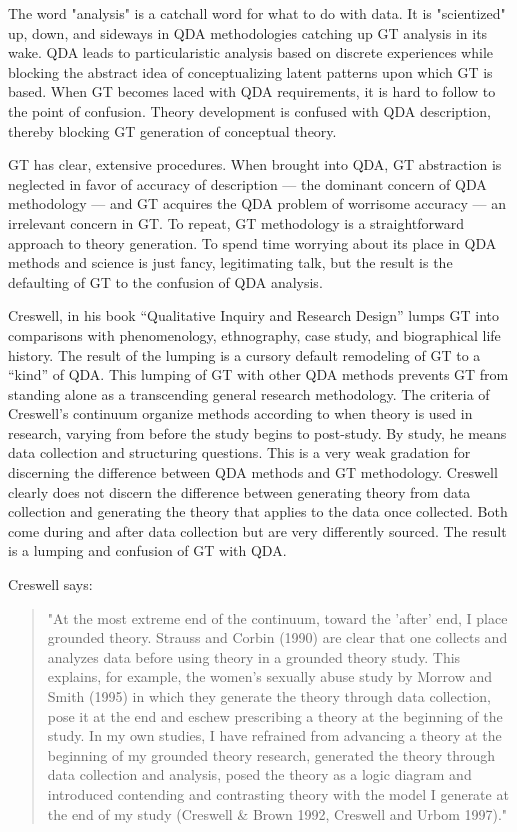 The word "analysis" is a catchall word for what to do with data.
It is "scientized" up, down, and sideways in QDA methodologies catching up GT analysis in its
wake.
QDA leads to particularistic analysis based on discrete experiences while
blocking the abstract idea of conceptualizing latent patterns upon which GT is
based.
When GT becomes laced with QDA requirements, it is hard to follow to
the point of confusion.
Theory development is confused with QDA description, thereby blocking GT generation of conceptual theory.

GT has clear, extensive procedures.
When brought into QDA, GT abstraction is neglected in favor of accuracy of description
--- the dominant concern of QDA methodology --- 
and GT acquires the QDA problem of worrisome accuracy
---
an irrelevant concern in GT.
To repeat, GT methodology is a straightforward approach to theory generation.
To spend time worrying about its place in QDA methods and science is just fancy, legitimating talk, but the result is the defaulting of GT to the confusion of QDA analysis.

Creswell, in his book “Qualitative Inquiry and Research Design”
\citep{book.creswell98}
lumps GT into comparisons with phenomenology, ethnography, case study, and biographical life history. 
The result of the lumping is a cursory default remodeling of GT to a “kind” of QDA. 
This lumping of GT with other QDA methods prevents GT from standing alone as a transcending general research methodology.
The criteria of Creswell’s continuum organize methods according to when theory is used in research, varying from before the study begins to post-study. 
By study, he means data collection and structuring questions. This is a very weak gradation for discerning the difference between QDA methods and GT methodology. 
Creswell clearly does not discern the difference between generating theory from data collection and generating the theory that applies to the
data once collected. 
Both come during and after data collection but are very differently sourced.
The result is a lumping and confusion of GT with QDA.

Creswell
\citep[p. 86]{book.creswell98}
says:
\begin{quote}
"At the most extreme end of the continuum, toward the 'after' end, I
place grounded theory. 
Strauss and Corbin (1990) are clear that one collects and analyzes data before using theory in a grounded theory study. 
This explains, for example, the women's sexually abuse study by
Morrow and Smith (1995) in which they generate the theory through
data collection, pose it at the end and eschew prescribing a theory at
the beginning of the study. 
In my own studies, I have refrained from
advancing a theory at the beginning of my grounded theory research,
generated the theory through data collection and analysis, posed the
theory as a logic diagram and introduced contending and contrasting
theory with the model I generate at the end of my study 
(Creswell \& Brown 1992, Creswell and Urbom 1997)."
\end{quote}

